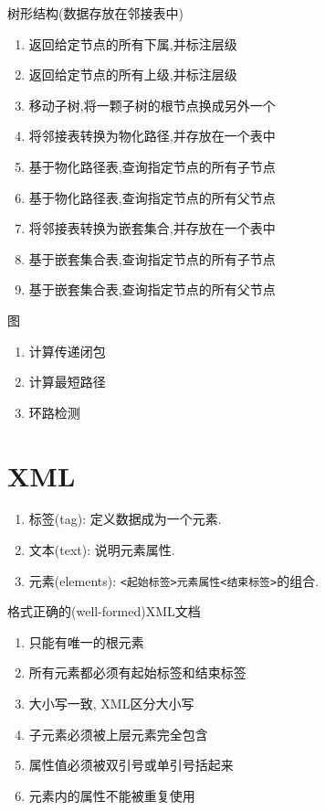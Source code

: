 树形结构(数据存放在邻接表中)
\begin{enumerate}
    \item 返回给定节点的所有下属,并标注层级
    \item 返回给定节点的所有上级,并标注层级
    \item 移动子树,将一颗子树的根节点换成另外一个
    \item 将邻接表转换为物化路径,并存放在一个表中
    \item 基于物化路径表,查询指定节点的所有子节点
    \item 基于物化路径表,查询指定节点的所有父节点
    \item 将邻接表转换为嵌套集合,并存放在一个表中
    \item 基于嵌套集合表,查询指定节点的所有子节点
    \item 基于嵌套集合表,查询指定节点的所有父节点
\end{enumerate}

图
\begin{enumerate}
    \item 计算传递闭包
    \item 计算最短路径
    \item 环路检测
\end{enumerate}

\section{XML}

\begin{enumerate}
    \item 标签(tag): 定义数据成为一个元素.
    \item 文本(text): 说明元素属性.
    \item 元素(elements): \texttt{<起始标签>元素属性<结束标签>}的组合.
\end{enumerate}

格式正确的(well-formed)XML文档
\begin{enumerate}
    \item 只能有唯一的根元素
    \item 所有元素都必须有起始标签和结束标签
    \item 大小写一致, XML区分大小写
    \item 子元素必须被上层元素完全包含
    \item 属性值必须被双引号或单引号括起来
    \item 元素内的属性不能被重复使用
\end{enumerate}

